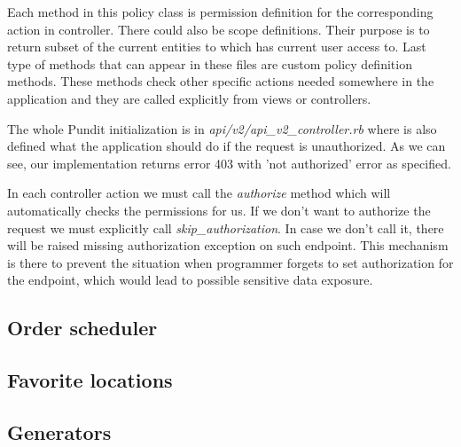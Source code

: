 Each method in this policy class is permission definition for the corresponding action in controller. There could also be scope definitions. Their purpose is to return subset of the current entities to which has current user access to. Last type of methods that can appear in these files are custom policy definition methods. These methods check other specific actions needed somewhere in the application and they are called explicitly from views or controllers.

The whole Pundit initialization is in \textit{api/v2/api\_v2\_controller.rb} where is also defined what the application should do if the request is unauthorized. As we can see, our implementation returns error 403 with 'not authorized' error as specified.

In each controller action we must call the \textit{authorize} method which will automatically checks the permissions for us. If we don't want to authorize the request we must explicitly call \textit{skip\_authorization}. In case we don't call it, there will be raised missing authorization exception on such endpoint. This mechanism is there to prevent the situation when programmer forgets to set authorization for the endpoint, which would lead to possible sensitive data exposure.

\subsection{Order scheduler}
\subsection{Favorite locations}
\subsection{Generators}
